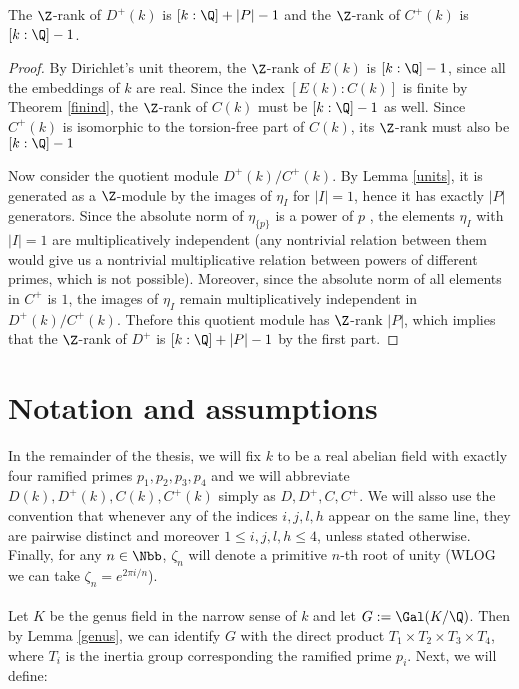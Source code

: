 \begin{prop}\label{Drank}
The $\Z$-rank of $D^+(k)$ is $[k:\Q]+|P|-1$ and the $\Z$-rank of $C^+(k)$ is $[k:\Q]-1$.
\end{prop}
\begin{proof}
By Dirichlet's unit theorem, the $\Z$-rank of $E(k)$ is $[k:\Q]-1$, since all the embeddings of $k$ are real. Since the index $[E(k):C(k)]$ is finite by Theorem \ref{finind},  the $\Z$-rank of $C(k)$ must be $[k:\Q]-1$ as well. Since $C^+(k)$ is isomorphic to the torsion-free part of $C(k)$, its $\Z$-rank must also be $[k:\Q]-1$

Now consider the quotient module $D^+(k)/C^+(k)$. By Lemma \ref{units}, it is generated as a $\Z$-module by the images of $\eta_I$ for $|I|=1$, hence it has exactly $|P|$ generators. Since the absolute norm of $\eta_{\{p\}}$ is a power of $p$%
, the elements $\eta_I$ with $|I|=1$ are multiplicatively independent (any nontrivial relation between them would give us a nontrivial multiplicative relation between powers of different primes, which is not possible). Moreover, since the absolute norm of all elements in $C^+$ is $1$, the images of $\eta_I$ remain multiplicatively independent in $D^+(k)/C^+(k)$. Thefore this quotient module has $\Z$-rank $|P|$, which implies that the $\Z$-rank of $D^+$ is $[k:\Q]+|P|-1$ by the first part.
\end{proof}

\section{Notation and assumptions}
In the remainder of the thesis, we will fix $k$ to be a real abelian field with exactly four ramified primes $p_1,p_2,p_3,p_4$ and we will abbreviate $D(k),D^{+}(k),C(k),C^+(k)$ simply as $D,D^{+},C,C^+$. We will alsso use the convention that whenever any of the indices $i,j,l,h$ appear on the same line, they are pairwise distinct and moreover $1\leq i,j,l,h\leq 4$, unless stated otherwise. Finally, for any $n\in \Nbb$, $\zeta_n$ will denote a primitive $n$-th root of unity (WLOG we can take $\zeta_n=e^{2\pi i/n}$). 

\paragraph*{}
Let $K$ be the genus field in the narrow sense of $k$ and let $G:=\Gal(K/\Q)$. Then by Lemma \ref{genus}, we can identify $G$ with the direct product $T_1\times T_2\times T_3\times T_4$, where $T_i$ is the inertia group corresponding the ramified prime $p_i$. Next, we will define:


